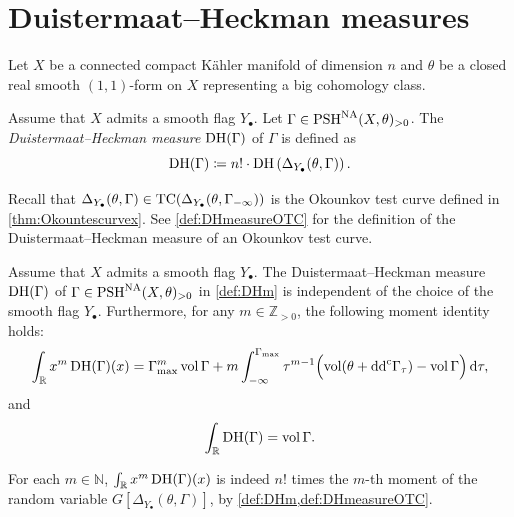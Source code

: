 \section{Duistermaat--Heckman measures}\label{sec:DHmeasure}
Let $X$ be a connected compact K\"ahler manifold of dimension $n$ and $\theta$ be a closed real smooth $(1,1)$-form on $X$ representing a big cohomology class.



\begin{definition}\label{def:DHm}
Assume that $X$ admits a smooth flag $Y_{\bullet}$. Let $\Gamma\in \mathrm{PSH}^{\mathrm{NA}}(X,\theta)_{>0}$.
    The \emph{Duistermaat--Heckman measure} $\DHm(\Gamma)$\index{$\DHm(\Gamma)$} of $\Gamma$ is defined as
    \[
    \operatorname{DH}(\Gamma)\coloneqq n!\cdot \operatorname{DH}\left(\Delta_{Y_{\bullet}}(\theta,\Gamma)\right).
    \]
\end{definition}
Recall that $\Delta_{Y_{\bullet}}(\theta,\Gamma)\in \mathrm{TC}(\Delta_{Y_{\bullet}}(\theta,\Gamma_{-\infty}))$ is the Okounkov test curve defined in \cref{thm:Okountescurvex}.
See \cref{def:DHmeasureOTC} for the definition of the Duistermaat--Heckman measure of an Okounkov test curve.

\begin{theorem}\label{thm:DHindep}
Assume that $X$ admits a smooth flag $Y_{\bullet}$.
    The Duistermaat--Heckman measure $\DHm(\Gamma)$ of $\Gamma\in \mathrm{PSH}^{\mathrm{NA}}(X,\theta)_{>0}$ in \cref{def:DHm} is independent of the choice of the smooth flag $Y_{\bullet}$. Furthermore, for any $m\in \mathbb{Z}_{>0}$, the following moment identity holds:
    \begin{equation}\label{eq:momentDHmtc1}
    \int_{\mathbb{R}}x^m\operatorname{DH}(\Gamma)(x)=\Gamma_{\max}^m\operatorname{vol} \Gamma+m\int_{-\infty}^{\Gamma_{\max}}\tau^{m-1}\Bigl( \operatorname{vol} (\theta+\mathrm{dd}^{\mathrm{c}} \Gamma_{\tau})-\operatorname{vol} \Gamma \Bigr)\,\mathrm{d}\tau,
    \end{equation}
    and
    \begin{equation}\label{eq:momentDHmtc2}
        \int_{\mathbb{R}}\operatorname{DH}(\Gamma)=\operatorname{vol} \Gamma.
    \end{equation}
\end{theorem}
For each $m\in \mathbb{N}$, $\int_{\mathbb{R}}x^m\operatorname{DH}(\Gamma)(x)$ is indeed $n!$ times the $m$-th moment of the random variable $G[\Delta_{Y_{\bullet}}(\theta,\Gamma)]$, by \cref{def:DHm,def:DHmeasureOTC}.

